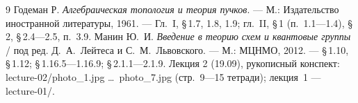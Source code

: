 \documentclass[11pt,b5paper]{article}
\theoremstyle{plain}
\theoremstyle{definition}
\theoremstyle{remark}
\begin{document}
\begin{thebibliography}{9}
 Годеман Р. \emph{Алгебраическая топология и теория пучков}. --- М.:
 Издательство иностранной литературы, 1961. --- Гл.~I, \S\,1.7, 1.8, 1.9;
 гл.~II, \S\,1 (п.~1.1---1.4), \S\,2, \S\,2.4---2.5, п.~3.9.
 Манин Ю.~И. \emph{Введение в теорию схем и квантовые группы} / под ред.
  Д.~А.~Лейтеса и С.~М.~Львовского. --- М.: МЦНМО, 2012. ---
  \S\,1.10, \S\,1.12; \S\,1.16.5---1.16.9; \S\,2.1.1---2.1.9.
 Лекция 2 (19.09), рукописный конспект: lecture-02/photo\_1.jpg
 \ldots\ photo\_7.jpg (стр.~9---15 тетради); лекция~1 ---
 lecture-01/.
\end{thebibliography}
\end{document}
